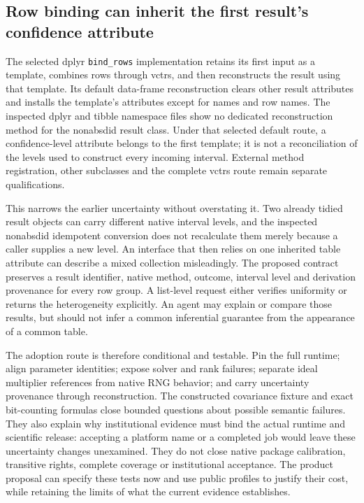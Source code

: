 \subsection{Row binding can inherit the first result's confidence attribute}

The selected dplyr \texttt{bind\_rows} implementation retains its first input as a template, combines rows through vctrs, and then reconstructs the result using that template. Its default data-frame reconstruction clears other result attributes and installs the template's attributes except for names and row names. The inspected dplyr and tibble namespace files show no dedicated reconstruction method for the nonabsdid result class. Under that selected default route, a confidence-level attribute belongs to the first template; it is not a reconciliation of the levels used to construct every incoming interval. External method registration, other subclasses and the complete vctrs route remain separate qualifications.~\citep{exec29_panel_runtime_sources}

This narrows the earlier uncertainty without overstating it. Two already tidied result objects can carry different native interval levels, and the inspected nonabsdid idempotent conversion does not recalculate them merely because a caller supplies a new level. An interface that then relies on one inherited table attribute can describe a mixed collection misleadingly. The proposed contract preserves a result identifier, native method, outcome, interval level and derivation provenance for every row group. A list-level request either verifies uniformity or returns the heterogeneity explicitly. An agent may explain or compare those results, but should not infer a common inferential guarantee from the appearance of a common table.~\citep{exec29_panel_inference_sources,exec29_panel_runtime_sources}

The adoption route is therefore conditional and testable. Pin the full runtime; align parameter identities; expose solver and rank failures; separate ideal multiplier references from native RNG behavior; and carry uncertainty provenance through reconstruction. The constructed covariance fixture and exact bit-counting formulas close bounded questions about possible semantic failures. They also explain why institutional evidence must bind the actual runtime and scientific release: accepting a platform name or a completed job would leave these uncertainty changes unexamined. They do not close native package calibration, transitive rights, complete coverage or institutional acceptance. The product proposal can specify these tests now and use public profiles to justify their cost, while retaining the limits of what the current evidence establishes.~\citep{exec29_panel_runtime_sources,exec29_panel_runtime_reference}
